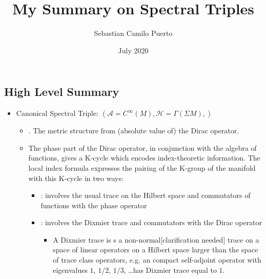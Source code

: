 \documentclass{article}
\title{My Summary on Spectral Triples}
\author{Sebastian Camilo Puerto}
\date{July 2020}
\begin{document}
\maketitle

\tableofcontents

\subsection{High Level Summary}

    \begin{itemize}

    \item Canonical Spectral Triple: $(\mathcal A = C^\infty(M), \mathcal H = \Gamma(\Sigma M), )$
    
        \begin{itemize}
            
        \item {}. The metric structure from (absolute value of) the Dirac operator.
        
        \item The phase part of the Dirac operator, in conjunction with the algebra of functions, gives a K-cycle which encodes index-theoretic information. The local index formula expresses the pairing of the K-group of the manifold with this K-cycle in two ways:
        
            \begin{itemize}
                
            \item {}: involves the usual trace on the Hilbert space and commutators of functions with the phase operator
            
            \item {}: involves the Dixmier trace and commutators with the Dirac operator 
            
                \begin{itemize}
                    
                \item A Dixmier trace is s a non-normal[clarification needed] trace on a space of linear operators on a Hilbert space larger than the space of trace class operators, e.g. an compact self-adjoint operator with eigenvalues $1$, $1/2$, $1/3$, \dots has Dixmier trace equal to $1$. 
                    

\end{itemize}
\end{itemize}
\end{itemize}
\end{itemize}
\end{document}
